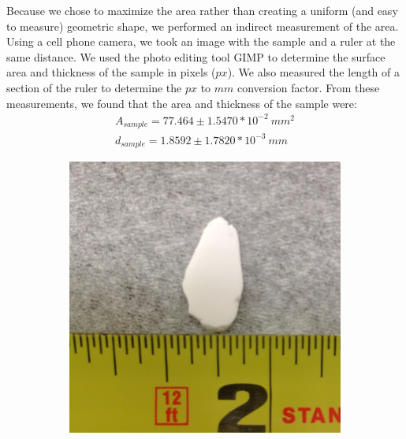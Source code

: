 \documentclass[%
 reprint,
 amsmath,amssymb,
 aps,
 pra,
]{revtex4-1}
\begin{document}
Because we chose to maximize the area rather than creating a uniform (and easy to measure) geometric shape, we performed an indirect measurement of the area. Using a cell phone camera, we took an image with the sample and a ruler at the same distance. We used the photo editing tool GIMP to determine the surface area and thickness of the sample in pixels ($px$). We also measured the length of a section of the ruler to determine the $px$ to $mm$ conversion factor. From these measurements, we found that the area and thickness of the sample were:
\begin{gather}
	A_{sample} = 77.464 \pm 1.5470*10^{-2} ~mm^2  \nonumber \\
	d_{sample} = 1.8592 \pm 1.7820*10^{-3} ~mm	 \nonumber
\end{gather}

\begin{figure}[H]
	\centering
	\begin{subfigure}{0.22\textwidth}
		\includegraphics[width=1\textwidth]{sample_area.jpg}
		\caption{}
		\label{fig:sample:area}
	\end{subfigure}
	\begin{subfigure}{0.22\textwidth}

\end{subfigure}
\end{figure}
\end{document}
